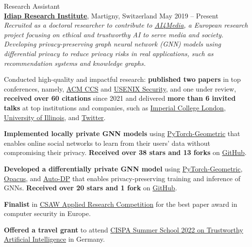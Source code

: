 \documentclass[11pt]{article}
\begin{document}
\begin{outerlist}

	\item {Research Assistant}\\
	\textbf{\href{https://idiap.ch}{Idiap Research Institute}}, Martigny, Switzerland \hfill {May 2019 -- Present}\\
  \textit{Recruited as a doctoral researcher to contribute to \href{https://www.ai4media.eu/}{AI4Media}, a European research project focusing on ethical and trustworthy AI to serve media and society. Developing privacy-preserving graph neural network (GNN) models using differential privacy to reduce privacy risks in real applications, such as recommendation systems and knowledge graphs.}
	\begin{innerlist}
		\item Conducted high-quality and impactful research: \textbf{published two papers} in top conferences, namely, \href{https://www.sigsac.org/ccs/CCS2021/}{ACM CCS} and \href{https://www.usenix.org/conference/usenixsecurity23/}{USENIX Security}, and one under review, \textbf{received over 60 citations} since 2021 and delivered \textbf{more than 6 invited talks} at top institutions and companies, such as \href{https://ix.imperial.ac.uk/}{Imperial College London}, \href{https://cs.uic.edu/}{University of Illinois}, and \href{https://twitter.com/}{Twitter}.
		\item \textbf{Implemented locally private GNN models} using \href{https://www.pyg.org/}{PyTorch-Geometric} that enables online social networks to learn from their users' data without compromising their privacy. \textbf{Received over 38 stars and 13 forks} on \href{https://github.com/sisaman/LPGNN}{GitHub}.
		\item \textbf{Developed a differentially private GNN model} using \href{https://www.pyg.org/}{PyTorch-Geometric}, \href{https://opacus.ai/}{Opacus}, and \href{https://github.com/yuxiangw/autodp}{Auto-DP} that enables privacy-preserving training and inference of GNNs. \textbf{Received over 20 stars and 1 fork} on \href{https://github.com/sisaman/GAP}{GitHub}.
		\item \textbf{Finalist} in \href{https://www.csaw.io/research}{CSAW Applied Research Competition} for the best paper award in computer security in Europe.
		\item \textbf{Offered a travel grant} to attend \href{https://cispa.de/en/summer-school-2022}{CISPA Summer School 2022 on Trustworthy Artificial Intelligence} in Germany.
	\end{innerlist}


\end{outerlist}
\end{document}
